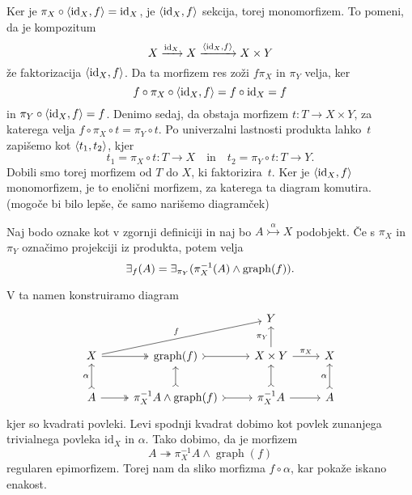 \documentclass[../kategoricna_logika.tex]{subfiles}
\begin{document}
\begin{dokaz}
  Ker je $\pi_X \circ \langle \mathrm{id}_X, f \rangle = \mathrm{id}_X$, je
  $\langle \mathrm{id}_X, f \rangle$ sekcija, torej monomorfizem. To pomeni,
  da je kompozitum
  \[X \xrightarrow{\mathrm{id}_X} X
    \xrightarrow{\langle \mathrm{id}_X,f \rangle} X \times Y\] že
  faktorizacija $\langle \mathrm{id}_X, f \rangle$. Da ta morfizem res zoži
  $f \pi_X$ in $\pi_Y$ velja, ker
  \[ f \circ \pi_X \circ \langle \mathrm{id}_X, f \rangle = f \circ
    \mathrm{id}_X = f\] in $\pi_Y \circ \langle \mathrm{id}_X, f \rangle = f$.
  Denimo sedaj, da obstaja morfizem $t : T \to X \times Y$, za
  katerega velja $f \circ \pi_X \circ t = \pi_Y \circ t$. Po
  univerzalni lastnosti produkta lahko~$t$ zapišemo kot
  $\langle t_1, t_2 \rangle$, kjer
  \[t_1 = \pi_X \circ t : T \to X \quad \text{in} \quad t_2 = \pi_Y
    \circ t : T \to Y. \] Dobili smo torej morfizem od $T$ do $X$, ki
  faktorizira~$t$. Ker je $\langle \mathrm{id}_X, f \rangle$ monomorfizem, je
  to enolični morfizem, za katerega ta diagram komutira. (mogoče bi
  bilo lepše, če samo narišemo diagramček)
\end{dokaz}
\begin{lema}
  Naj bodo oznake kot v zgornji definiciji in naj bo
  $A \overset{\alpha}{\rightarrowtail} X$ podobjekt. Če s $\pi_X$ in
  $\pi_Y$ označimo projekciji iz produkta, potem velja
  $$\exists_f(A) = \exists_{\pi_Y}(\pi_X^{-1}(A) \wedge \operatorname{graph}(f)).$$
\end{lema}
\begin{dokaz}
  V ta namen konstruiramo diagram
  \begin{equation*}
    \begin{tikzcd}
      & & Y & \\
      X \ar[urr, "f"] \ar[r, two heads] & \operatorname{graph}(f)
      \ar[r, tail] &
      X \times Y \ar[u, "\pi_Y"] \ar[r, "\pi_X"] & X \\
      A \ar[u, tail, "\alpha"] \ar[r, two heads] & \pi_X^{-1}A \land
      \operatorname{graph}(f) \ar[u, tail] \ar[r, tail] & \pi_X^{-1}A
      \ar[u, tail] \ar[r] & A \ar[u, tail, "\alpha"]
    \end{tikzcd}
  \end{equation*}
  kjer so kvadrati povleki.  Levi spodnji kvadrat dobimo kot povlek
  zunanjega trivialnega povleka $\mathrm{id}_X$ in $\alpha$.  Tako
  dobimo, da je morfizem
  $$A \twoheadrightarrow \pi_X^{-1}A \land \operatorname{graph}(f)$$
  regularen epimorfizem.  Torej nam da sliko morfizma
  $f \circ \alpha$, kar pokaže iskano enakost.
\end{dokaz}
\end{document}
